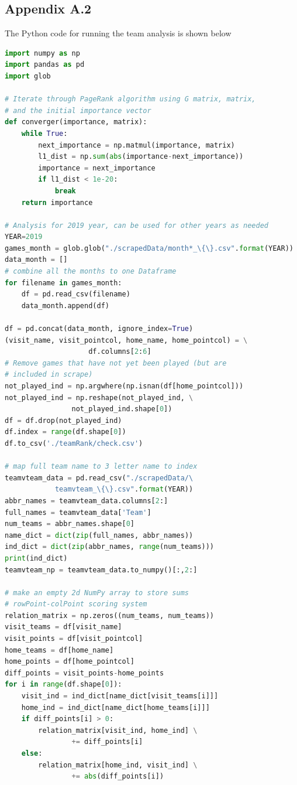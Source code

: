 \documentclass[12pt]{article}%
\begin{document}
\subsection{Appendix A.2}
The Python code for running the team analysis is shown below
\begin{lstlisting}[language=Python]
import numpy as np
import pandas as pd
import glob

# Iterate through PageRank algorithm using G matrix, matrix, 
# and the initial importance vector
def converger(importance, matrix):
	while True:
		next_importance = np.matmul(importance, matrix)
		l1_dist = np.sum(abs(importance-next_importance))
		importance = next_importance
		if l1_dist < 1e-20:
			break
	return importance

# Analysis for 2019 year, can be used for other years as needed
YEAR=2019
games_month = glob.glob("./scrapedData/month*_\{\}.csv".format(YEAR))
data_month = []
# combine all the months to one Dataframe
for filename in games_month:
	df = pd.read_csv(filename)
	data_month.append(df)

df = pd.concat(data_month, ignore_index=True)
(visit_name, visit_pointcol, home_name, home_pointcol) = \
					df.columns[2:6]
# Remove games that have not yet been played (but are 
# included in scrape)
not_played_ind = np.argwhere(np.isnan(df[home_pointcol]))
not_played_ind = np.reshape(not_played_ind, \
				not_played_ind.shape[0])
df = df.drop(not_played_ind)
df.index = range(df.shape[0])
df.to_csv('./teamRank/check.csv')

# map full team name to 3 letter name to index
teamvteam_data = pd.read_csv("./scrapedData/\
			teamvteam_\{\}.csv".format(YEAR))
abbr_names = teamvteam_data.columns[2:]
full_names = teamvteam_data['Team']
num_teams = abbr_names.shape[0]
name_dict = dict(zip(full_names, abbr_names))
ind_dict = dict(zip(abbr_names, range(num_teams)))
print(ind_dict)
teamvteam_np = teamvteam_data.to_numpy()[:,2:]

# make an empty 2d NumPy array to store sums
# rowPoint-colPoint scoring system
relation_matrix = np.zeros((num_teams, num_teams))
visit_teams = df[visit_name]
visit_points = df[visit_pointcol]
home_teams = df[home_name]
home_points = df[home_pointcol]
diff_points = visit_points-home_points
for i in range(df.shape[0]):
	visit_ind = ind_dict[name_dict[visit_teams[i]]]
	home_ind = ind_dict[name_dict[home_teams[i]]]
	if diff_points[i] > 0:
		relation_matrix[visit_ind, home_ind] \
				+= diff_points[i]
	else:
		relation_matrix[home_ind, visit_ind] \
				+= abs(diff_points[i])


\end{lstlisting}
\end{document}
